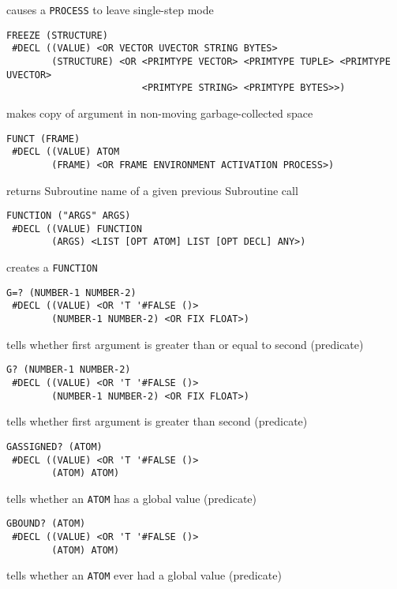 \documentclass[a4paper]{scrbook}
\begin{document}
causes a \texttt{PROCESS} to leave single-step mode

\begin{verbatim}
FREEZE (STRUCTURE)
 #DECL ((VALUE) <OR VECTOR UVECTOR STRING BYTES>
        (STRUCTURE) <OR <PRIMTYPE VECTOR> <PRIMTYPE TUPLE> <PRIMTYPE UVECTOR>
                        <PRIMTYPE STRING> <PRIMTYPE BYTES>>)
\end{verbatim}

makes copy of argument in non-moving garbage-collected space

\begin{verbatim}
FUNCT (FRAME)
 #DECL ((VALUE) ATOM
        (FRAME) <OR FRAME ENVIRONMENT ACTIVATION PROCESS>)
\end{verbatim}

returns Subroutine name of a given previous Subroutine call

\begin{verbatim}
FUNCTION ("ARGS" ARGS)
 #DECL ((VALUE) FUNCTION
        (ARGS) <LIST [OPT ATOM] LIST [OPT DECL] ANY>)
\end{verbatim}

creates a \texttt{FUNCTION}

\begin{verbatim}
G=? (NUMBER-1 NUMBER-2)
 #DECL ((VALUE) <OR 'T '#FALSE ()>
        (NUMBER-1 NUMBER-2) <OR FIX FLOAT>)
\end{verbatim}

tells whether first argument is greater than or equal to second (predicate)

\begin{verbatim}
G? (NUMBER-1 NUMBER-2)
 #DECL ((VALUE) <OR 'T '#FALSE ()>
        (NUMBER-1 NUMBER-2) <OR FIX FLOAT>)
\end{verbatim}

tells whether first argument is greater than second (predicate)

\begin{verbatim}
GASSIGNED? (ATOM)
 #DECL ((VALUE) <OR 'T '#FALSE ()>
        (ATOM) ATOM)
\end{verbatim}

tells whether an \texttt{ATOM} has a global value (predicate)

\begin{verbatim}
GBOUND? (ATOM)
 #DECL ((VALUE) <OR 'T '#FALSE ()>
        (ATOM) ATOM)
\end{verbatim}

tells whether an \texttt{ATOM} ever had a global value (predicate)
\end{document}
